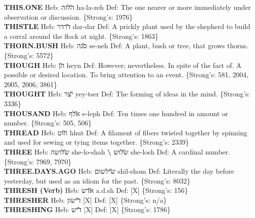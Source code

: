 {\textbf{THIS.ONE} Heb: {\large\H הלזה} ha-la-zeh Def: The one nearer or more immediately under observation or discussion. \{Strong's: 1976\}\hfill{}\\

\textbf{THISTLE} Heb: {\large\H דרדר} dar-dar Def: A prickly plant used by the shepherd to build a corral around the flock at night. \{Strong's: 1863\}\hfill{}\\

\textbf{THORN.BUSH} Heb: {\large\H סנה} se-neh Def: A plant, bush or tree, that grows thorns. \{Strong's: 5572\}\hfill{}\\

\textbf{THOUGH} Heb: {\large\H הן} heyn Def: However; nevertheless. In spite of the fact of. A possible or desired location. To bring attention to an event. \{Strong's: 581, 2004, 2005, 2006, 3861\}\hfill{}\\

\textbf{THOUGHT} Heb: {\large\H יצר} yey-tser Def: The forming of ideas in the mind. \{Strong's: 3336\}\hfill{}\\

\textbf{THOUSAND} Heb: {\large\H אלף} e-leph Def: Ten times one hundred in amount or number. \{Strong's: 505, 506\}\hfill{}\\

\textbf{THREAD} Heb: {\large\H חוט} hhut Def: A filament of fibers twisted together by spinning and used for sewing or tying items together. \{Strong's: 2339\}\hfill{}\\

\textbf{THREE} Heb: {\large\H שלושה} she-lo-shah \textbf{\textbackslash{}} {\large\H שלוש} she-losh Def: A cardinal number. \{Strong's: 7969, 7970\}\hfill{}\\

\textbf{THREE.DAYS.AGO} Heb: {\large\H שילשום} shil-shom Def: Literally the day before yesterday, but used as an idiom for the past. \{Strong's: 8032\}\hfill{}\\

\textbf{THRESH (Verb)} Heb: {\large\H אדש} a.d.sh Def: {[}X{]} \{Strong's: 156\}\hfill{}\\

\textbf{THRESHER} Heb: {\large\H דישון} {[}X{]} Def: {[}X{]} \{Strong's: n/a\}\hfill{}\\

\textbf{THRESHING} Heb: {\large\H דיש} {[}X{]} Def: {[}X{]} \{Strong's: 1786\}\hfill{}\\

}
